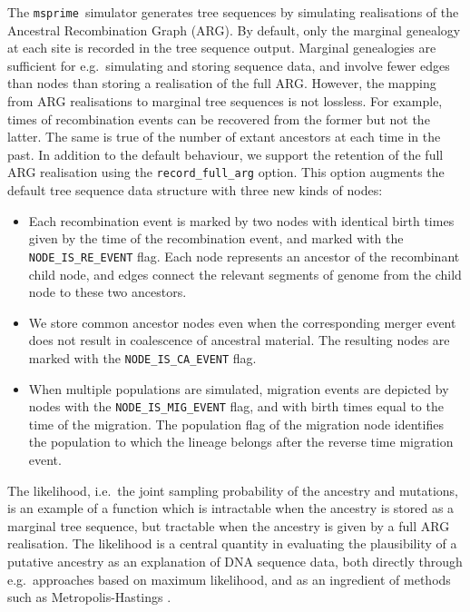 \documentclass{article}
\newcommand{\msprime}[0]{\texttt{msprime}}
\begin{document}
The \msprime~simulator generates tree sequences by simulating realisations of the
Ancestral Recombination Graph (ARG).
By default, only the marginal genealogy at each site is recorded in the tree sequence
output.
Marginal genealogies are sufficient for e.g.~simulating and storing sequence data,
and involve fewer edges than nodes than storing a realisation of the full ARG.
However, the mapping from ARG realisations to marginal tree sequences is not lossless.
For example, times of recombination events can be recovered from the former
but not the latter.
The same is true of the number of extant ancestors at each time in the past.
In addition to the default behaviour, we support the retention of the full
ARG realisation using the \texttt{record\_full\_arg} option.
This option augments the default tree sequence data structure with three
new kinds of nodes:
\begin{itemize}
\item Each recombination event is marked by two nodes with identical birth times
given by the time of the recombination event, and marked with the
\texttt{NODE\_IS\_RE\_EVENT} flag. 
Each node represents an ancestor of the recombinant child node, and edges connect
the relevant segments of genome from the child node to these two ancestors.
\item We store common ancestor nodes even when the corresponding merger event
does not result in coalescence of ancestral material.
The resulting nodes are marked with the \texttt{NODE\_IS\_CA\_EVENT} flag.
\item When multiple populations are simulated, migration events are depicted by nodes
with the \texttt{NODE\_IS\_MIG\_EVENT} flag, and with birth times equal to the time of
the migration.
The population flag of the migration node identifies the population to which the lineage
belongs after the reverse time migration event.
\end{itemize}

The likelihood, i.e.~the joint sampling probability of the ancestry and mutations,
is an example of a function which is intractable when the ancestry is stored as a
marginal tree sequence, but tractable when the ancestry is given by a full
ARG realisation.
The likelihood is a central quantity in evaluating the plausibility of a putative
ancestry as an explanation of DNA sequence data, both directly through
e.g.~approaches based on maximum likelihood, and as an ingredient of
methods such as Metropolis-Hastings
\citep{kuhner2000maximum, nielsen2000estimation, wang2008bayesian}.
\end{document}
